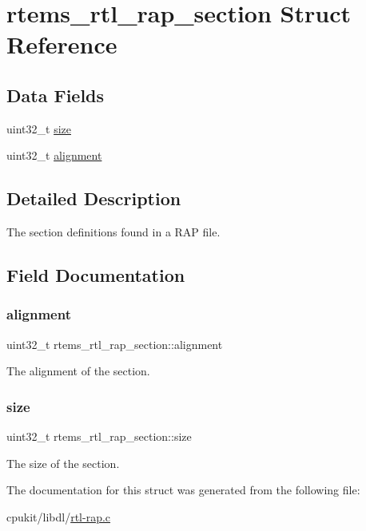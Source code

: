 \hypertarget{structrtems__rtl__rap__section}{}\section{rtems\+\_\+rtl\+\_\+rap\+\_\+section Struct Reference}
\label{structrtems__rtl__rap__section}
\subsection*{Data Fields}
\begin{DoxyCompactItemize}
\item 
uint32\+\_\+t \mbox{\hyperlink{structrtems__rtl__rap__section_a6449228959733fb41feaa9b436e5ac2d}{size}}
\item 
uint32\+\_\+t \mbox{\hyperlink{structrtems__rtl__rap__section_ac59fdc3e2559debfd2a7752d6732ef36}{alignment}}
\end{DoxyCompactItemize}


\subsection{Detailed Description}
The section definitions found in a R\+AP file. 

\subsection{Field Documentation}
\mbox{\label{structrtems__rtl__rap__section_ac59fdc3e2559debfd2a7752d6732ef36}} 
\subsubsection{\texorpdfstring{alignment}{alignment}}
{\footnotesize\ttfamily uint32\+\_\+t rtems\+\_\+rtl\+\_\+rap\+\_\+section\+::alignment}

The alignment of the section. \mbox{\label{structrtems__rtl__rap__section_a6449228959733fb41feaa9b436e5ac2d}} 
\subsubsection{\texorpdfstring{size}{size}}
{\footnotesize\ttfamily uint32\+\_\+t rtems\+\_\+rtl\+\_\+rap\+\_\+section\+::size}

The size of the section. 

The documentation for this struct was generated from the following file\+:\begin{DoxyCompactItemize}
\item 
cpukit/libdl/\mbox{\hyperlink{rtl-rap_8c}{rtl-\/rap.\+c}}\end{DoxyCompactItemize}
